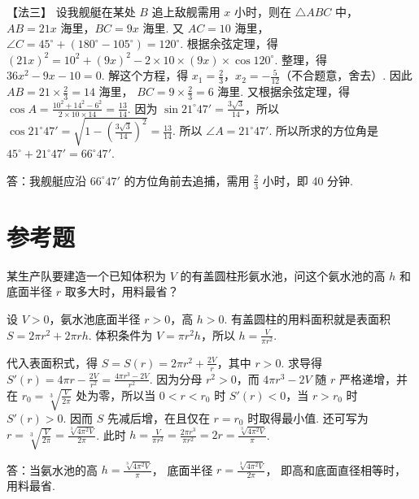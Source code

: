 \begin{solution}
【法三】
设我舰艇在某处 \(B\) 追上敌舰需用 \( x \) 小时，则在 \( \triangle ABC \) 中，
\( AB=21x\text{ 海里} \)，\( BC=9x\text{ 海里} \).
又 \( AC=10\text{ 海里} \)，
\( \angle C=45^\circ+\left( 180^\circ-105^\circ \right)=120^\circ \).
根据余弦定理，得
\( \left( 21x \right)^2=10^2+\left( 9x \right)^2-2\times 10\times \left( 9x \right)\times \cos 120^\circ \).
整理，得
\( 36x^2-9x-10=0 \).
解这个方程，得 \( x_1=\frac{2}{3} \)，\( x_2=-\frac{5}{12} \)（不合题意，舍去）.
因此
\( AB=21\times \frac{2}{3}=14\text{ 海里} \)，
\( BC=9\times \frac{2}{3}=6\text{ 海里} \).
又根据余弦定理，得
\( \cos A=\frac{10^2+14^2-6^2}{2\times 10\times 14}=\frac{13}{14} \).
因为 \( \sin 21^\circ47'=\frac{3\sqrt{3}}{14} \)，所以
\( \cos 21^\circ47'=\sqrt{1-\left( \frac{3\sqrt{3}}{14} \right)^2}=\frac{13}{14} \).
所以 \( \angle A=21^\circ47' \).
所以所求的方位角是 \( 45^\circ+21^\circ47'=66^\circ47' \).

答：我舰艇应沿 \(66^\circ47'\) 的方位角前去追捕，需用 \(\frac23\) 小时，即 40 分钟.
\end{solution}

\section{参考题}

\begin{problem}
某生产队要建造一个已知体积为 \(V\) 的有盖圆柱形氨水池，问这个氨水池的高 \( h \) 和底面半径 \( r \) 取多大时，用料最省？
\end{problem}

\begin{solution}
设 \(V>0\)，氨水池底面半径 \(r>0\)，高 \(h>0\). 有盖圆柱的用料面积就是表面积
\(S=2\pi r^2+2\pi rh\). 体积条件为
\(V=\pi r^2h\)，所以 \(h=\frac{V}{\pi r^2}\).


代入表面积式，得
\(S=S(r)=2\pi r^2+\frac{2V}{r}\)，其中 \(r>0\). 求导得
\(S'(r)=4\pi r-\frac{2V}{r^2}=\frac{4\pi r^3-2V}{r^2}\). 因为分母 \(r^2>0\)，而 \(4\pi r^3-2V\) 随 \(r\) 严格递增，并在
\(r_0=\sqrt[3]{\frac{V}{2\pi}}\) 处为零，所以当 \(0<r<r_0\) 时 \(S'(r)<0\)，当 \(r>r_0\) 时 \(S'(r)>0\). 因而 \(S\) 先减后增，在且仅在 \(r=r_0\) 时取得最小值. 还可写为
\(r=\sqrt[3]{\frac{V}{2\pi}}=\frac{\sqrt[3]{4\pi^2V}}{2\pi}\).
此时
\(h=\frac{V}{\pi r^2}=\frac{2\pi r^3}{\pi r^2}=2r=\frac{\sqrt[3]{4\pi^2V}}{\pi}\).

答：当氨水池的高
\( h=\frac{\sqrt[3]{4\pi^2V}}{\pi} \)，
底面半径
\( r=\frac{\sqrt[3]{4\pi^2V}}{2\pi} \)，
即高和底面直径相等时，用料最省.
\end{solution}

